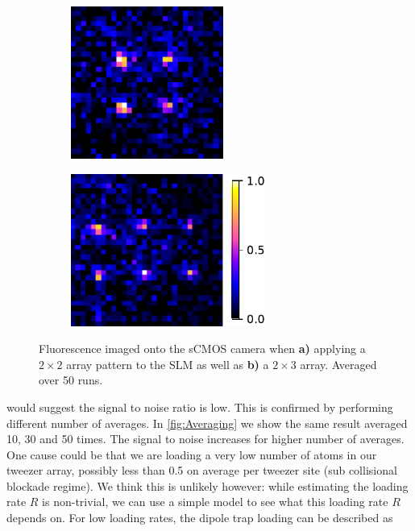 \begin{figure}
    \centering
	\begin{subfigure}{.49\linewidth}
		\centering
		\includegraphics[height=5cm]{figures/2x2fluorescence.pdf}
		\caption{}
		\label{fig:fluor2x2}
	\end{subfigure}
	\hfill
	\begin{subfigure}{.49\linewidth}
		\centering
		\includegraphics[height=5cm]{figures/2x3fluorescence.pdf}
		\caption{}
		\label{fig:fluor2x3}
	\end{subfigure}
	\caption{
	Fluorescence imaged onto the sCMOS camera when \textsf{\textbf{a)}} applying a $2\times2$ array pattern to the SLM as well as \textsf{\textbf{b)}} a $2\times 3$ array.
	Averaged over 50 runs.
    }
    \label{fig:fluorescence}
\end{figure}
 would suggest the signal to noise ratio is low. 
This is confirmed by performing different number of averages.
In \cref{fig:Averaging} we show the same result averaged 10, 30 and 50 times. 
The signal to noise increases for higher number of averages.
One cause could be that we are loading a very low number of atoms in our tweezer array, possibly less than 0.5 on average per tweezer site (sub collisional blockade regime).
We think this is unlikely however: while estimating the loading rate $R$ is non-trivial, we can use a simple model to see what this loading rate $R$ depends on. 
For low loading rates, the dipole trap loading can be described as \cite{Kuppens2000}

